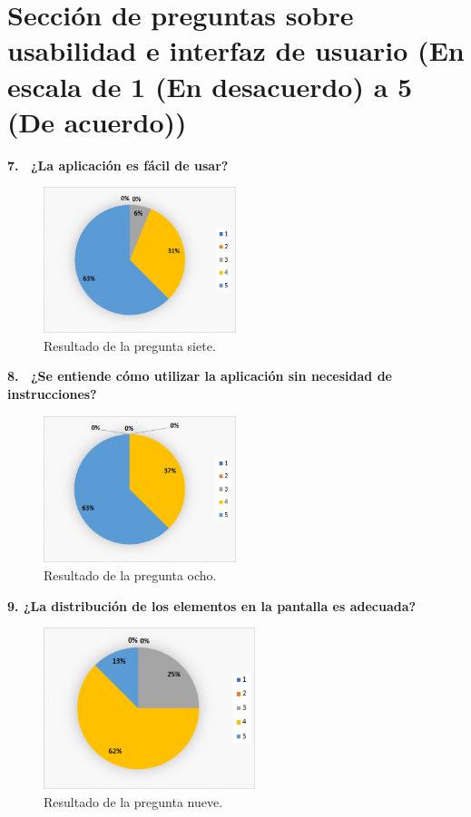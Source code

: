 \section{Sección de preguntas sobre usabilidad e interfaz de usuario (En escala de 1 (En desacuerdo) a 5 (De acuerdo))}

\textbf{7.  ¿La aplicación es fácil de usar?}

\begin{figure}[h]
    \centering
    \includegraphics[width=0.5\textwidth]{Imagenes/Pregunta7.png}
    \caption{\label{fig: Pregunta7}Resultado de la pregunta siete.}
\end{figure}

\textbf{8.  ¿Se entiende cómo utilizar la aplicación sin necesidad de instrucciones?}

\begin{figure}[h]
    \centering
    \includegraphics[width=0.5\textwidth]{Imagenes/Pregunta8.png}
    \caption{\label{fig: Pregunta8}Resultado de la pregunta ocho.}
\end{figure}

\newpage
\textbf{9. ¿La distribución de los elementos en la pantalla es adecuada?}

\begin{figure}[h]
    \centering
    \includegraphics[width=0.55\textwidth]{Imagenes/Pregunta9.png}
    \caption{\label{fig: Pregunta9}Resultado de la pregunta nueve.}
\end{figure}


